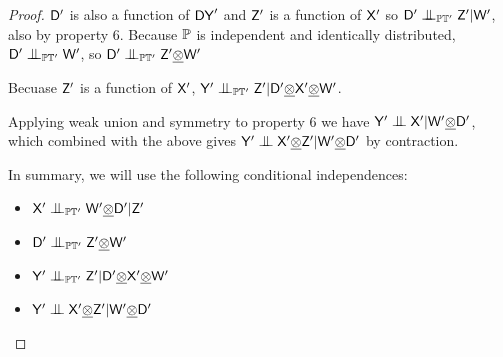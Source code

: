 \begin{proof}
$\mathsf{D}'$ is also a function of $\mathsf{DY}'$ and $\mathsf{Z}'$ is a function of $\mathsf{X}'$ so $\RV{D}'\CI_{\prob{P}\kernel{T}'}\RV{Z}'|\RV{W}'$, also by property 6. Because $\mathbb{P}$ is independent and identically distributed, $\RV{D}'\CI_{\prob{P}\kernel{T}'} \RV{W}'$, so $\RV{D}'\CI_{\prob{P}\kernel{T}'}\RV{Z}'\utimes \RV{W}'$

Becuase $\mathsf{Z}'$ is a function of $\mathsf{X}'$, $\RV{Y}'\CI_{\prob{P}\kernel{T}'}\RV{Z}'|\RV{D}'\utimes\RV{X}'\utimes\RV{W}'$. 

Applying weak union and symmetry to property 6 we have $\RV{Y}'\CI \RV{X}'|\RV{W}'\utimes\RV{D}'$, which combined with the above gives $\RV{Y}'\CI \RV{X}'\utimes \RV{Z}' |\RV{W}'\utimes\RV{D}'$ by contraction.

In summary, we will use the following conditional independences:
\begin{itemize}
    \item $\RV{X}'\CI_{\prob{P}\kernel{T}'} \RV{W}'\utimes \RV{D}'|\RV{Z}'$
    \item $\RV{D}'\CI_{\prob{P}\kernel{T}'}\RV{Z}'\utimes \RV{W}'$
    \item $\RV{Y}'\CI_{\prob{P}\kernel{T}'}\RV{Z}'|\RV{D}'\utimes\RV{X}'\utimes\RV{W}'$
    \item $\RV{Y}'\CI \RV{X}'\utimes \RV{Z}'|\RV{W}'\utimes\RV{D}'$
\end{itemize}


\end{proof}
